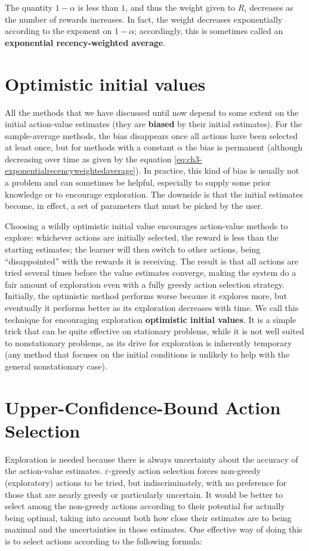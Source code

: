 The quantity $1 - \alpha$ is less than $1$, and thus the weight given to $R_i$ decreases as the number of rewards increases. In fact, the weight decreases exponentially according to the exponent on $1 - \alpha$; accordingly, this is sometimes called an \textbf{exponential recency-weighted average}.

\section{Optimistic initial values}
All the methods that we have discussed until now depend to some extent on the initial action-value estimates (they are \textbf{biased} by their initial estimates). For the sample-average methods, the bias disappears once all actions have been selected at least once, but for methods with a constant $\alpha$ the bias is permanent (although decreasing over time as given by the equation \eqref{eq:ch3-exponentialrecencyweightedaverage}). In practice, this kind of bias is usually not a problem and can sometimes be helpful, especially to supply some prior knowledge or to encourage exploration. The downside is that the initial estimates become, in effect, a set of parameters that must be picked by the user.

Choosing a wildly optimistic initial value encourages action-value methods to explore: whichever actions are initially selected, the reward is less than the starting estimates; the learner will then switch to other actions, being ``disappointed'' with the rewards it is receiving. The result is that all actions are tried several times before the value estimates converge, making the system do a fair amount of exploration even with a fully greedy action selection strategy. Initially, the optimistic method performs worse because it explores more, but eventually it performs better as its exploration decreases with time. We call this technique for encouraging exploration \textbf{optimistic initial values}. It is a simple trick that can be quite effective on stationary problems, while it is not well suited to nonstationary problems, as its drive for exploration is inherently temporary (any method that focuses on the initial conditions is unlikely to help with the general nonstationary case).

\section{Upper-Confidence-Bound Action Selection}
Exploration is needed because there is always uncertainty about the accuracy of the action-value estimates. $\varepsilon$-greedy action selection forces non-greedy (exploratory) actions to be tried, but indiscriminately, with no preference for those that are nearly greedy or particularly uncertain. It would be better to select among the non-greedy actions according to their potential for actually being optimal, taking into account both how close their estimates are to being maximal and the uncertainties in those estimates. One effective way of doing this is to select actions according to the following formula:

